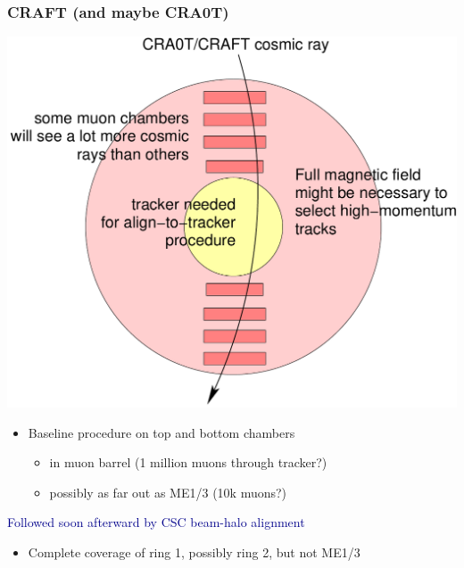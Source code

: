 \documentclass[compress]{beamer}
\begin{document}
\begin{frame}
\frametitle{CRAFT (and maybe CRA0T)}
\begin{center}
\includegraphics[width=0.6\linewidth]{craft.pdf}
\end{center}

\small
\vspace{-0.75 cm}
\begin{itemize}
\item Baseline procedure on top and bottom chambers
\begin{itemize}
\item in muon barrel (1 million muons through tracker?)
\item possibly as far out as ME1/3 (10k muons?)
\end{itemize}
\end{itemize}

\hspace{-0.83 cm} \textcolor{darkblue}{\Large Followed soon afterward by CSC beam-halo alignment}
\begin{itemize}
\item Complete coverage of ring 1, possibly ring 2, but not ME1/3
\end{itemize}
\end{frame}


\end{document}
